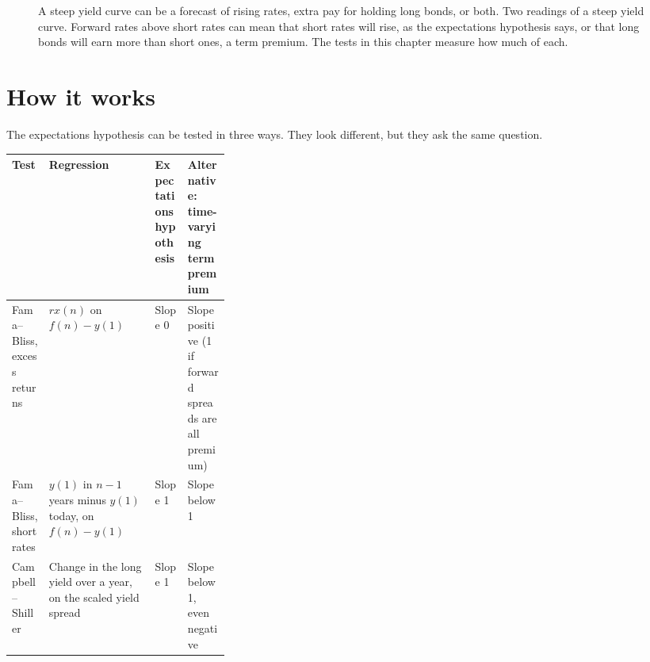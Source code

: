 \begin{figure}[htbp]
\centering
{}
\caption{A steep yield curve can be a forecast of rising rates, extra pay for holding long bonds, or both. Two readings of a steep yield curve. Forward rates above short rates can mean that short rates will rise, as the expectations hypothesis says, or that long bonds will earn more than short ones, a term premium. The tests in this chapter measure how much of each.}
\label{fig:07-readings}
\end{figure}


\section{How it works}
\label{sec:07-how}

The expectations hypothesis can be tested in three ways. They look different, but they ask the same question.

\begin{center}
\small
\begin{tabularx}{0.9\linewidth}{@{}>{\raggedright\arraybackslash}p{0.17\linewidth}>{\raggedright\arraybackslash}X>{\raggedright\arraybackslash}p{0.15\linewidth}>{\raggedright\arraybackslash}X@{}}
\toprule
Test & Regression & Expectations hypothesis & Alternative: time-varying term premium \\
\midrule
Fama--Bliss, excess returns & $rx(n)$ on $f(n) - y(1)$ & Slope 0 & Slope positive (1 if forward spreads are all premium) \\
Fama--Bliss, short rates & $y(1)$ in $n-1$ years minus $y(1)$ today, on $f(n) - y(1)$ & Slope 1 & Slope below 1 \\
Campbell--Shiller & Change in the long yield over a year, on the scaled yield spread & Slope 1 & Slope below 1, even negative \\
\bottomrule
\end{tabularx}
\end{center}

